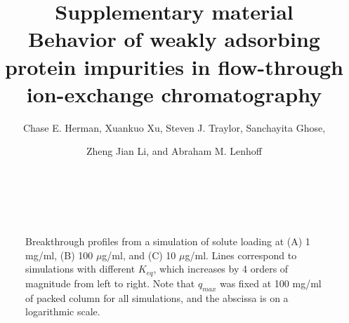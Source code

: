 \documentclass[11pt,a4paper]{article}
\title{\vspace{-5cm} {Supplementary material}\\[5mm] 
\textbf{Behavior of weakly adsorbing protein impurities in flow-through ion-exchange chromatography}}
\author{Chase E. Herman, Xuankuo Xu, Steven J. Traylor, Sanchayita Ghose, \and Zheng Jian Li, and Abraham M. Lenhoff}
\date{}
\begin{document}
\begin{titlingpage}
\maketitle
\end{titlingpage}

\begin{figure}[H]
    \centering
    \\
    \\
    
    \caption{Breakthrough profiles from a simulation of solute loading at (A) 1 mg/ml, (B) 100 $\mu$g/ml, and (C) 10 $\mu$g/ml. Lines correspond to simulations with different $K_{eq}$, which increases by 4 orders of magnitude from left to right. Note that $q_{max}$ was fixed at 100 mg/ml of packed column for all simulations, and the abscissa is on a logarithmic scale.}
    
    \label{fig:exploratory breakthrough curves - other concentrations}
\end{figure}
\end{document}
